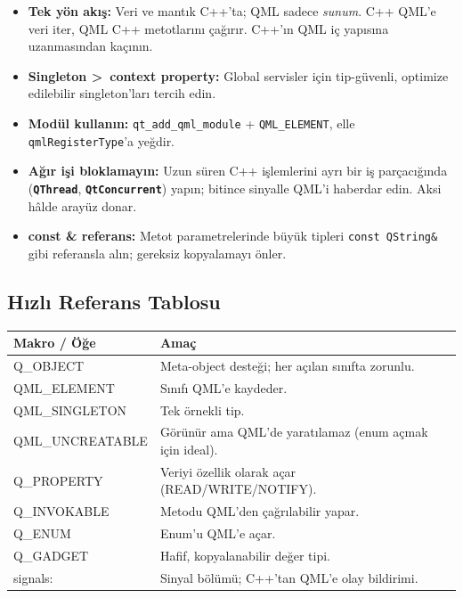 \documentclass[11pt,a4paper]{article}
\newcommand{\kls}[1]{\texttt{\color{anaMavi}\textbf{#1}}}
\newcommand{\kod}[1]{\texttt{\color{koyuGri}#1}}
\begin{document}
\begin{itemize}[leftmargin=1.4em]
\item \textbf{Tek yön akış:} Veri ve mantık C++'ta; QML sadece \emph{sunum}.
      C++ QML'e veri iter, QML C++ metotlarını çağırır. C++'ın QML iç yapısına
      uzanmasından kaçının.
\item \textbf{Singleton \textgreater\ context property:} Global servisler için
      tip-güvenli, optimize edilebilir singleton'ları tercih edin.
\item \textbf{Modül kullanın:} \kod{qt\_add\_qml\_module} + \kod{QML\_ELEMENT},
      elle \kod{qmlRegisterType}'a yeğdir.
\item \textbf{Ağır işi bloklamayın:} Uzun süren C++ işlemlerini ayrı bir iş
      parçacığında (\kls{QThread}, \kls{QtConcurrent}) yapın; bitince sinyalle
      QML'i haberdar edin. Aksi hâlde arayüz donar.
\item \textbf{const \& referans:} Metot parametrelerinde büyük tipleri
      \kod{const QString\&} gibi referansla alın; gereksiz kopyalamayı önler.
\end{itemize}

\subsection{Hızlı Referans Tablosu}

\begin{center}
\begin{tabularx}{\textwidth}{@{}>{\ttfamily\color{anaMavi}\small}l >{\raggedright\arraybackslash}X@{}}
\toprule
\rowcolor{acikMavi}\color{anaMavi}\textbf{Makro / Öğe} & \color{anaMavi}\textbf{Amaç} \\
\midrule
Q\_OBJECT & Meta-object desteği; her açılan sınıfta zorunlu. \\
\rowcolor{acikGri} QML\_ELEMENT & Sınıfı QML'e kaydeder. \\
QML\_SINGLETON & Tek örnekli tip. \\
\rowcolor{acikGri} QML\_UNCREATABLE & Görünür ama QML'de yaratılamaz (enum açmak için ideal). \\
Q\_PROPERTY & Veriyi özellik olarak açar (READ/WRITE/NOTIFY). \\
\rowcolor{acikGri} Q\_INVOKABLE & Metodu QML'den çağrılabilir yapar. \\
Q\_ENUM & Enum'u QML'e açar. \\
\rowcolor{acikGri} Q\_GADGET & Hafif, kopyalanabilir değer tipi. \\
signals: & Sinyal bölümü; C++'tan QML'e olay bildirimi. \\
\bottomrule
\end{tabularx}
\end{center}
\end{document}
